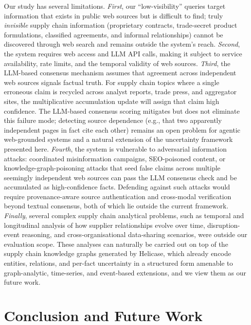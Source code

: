 \documentclass{article}
\begin{document}
Our study has several limitations. \textit{First}, our ``low-visibility'' queries target information that exists in public web sources but is difficult to find; truly \textit{invisible} supply chain information (proprietary contracts, trade-secret product formulations, classified agreements, and informal relationships) cannot be discovered through web search and remains outside the system's reach. \textit{Second}, the system requires web access and LLM API calls, making it subject to service availability, rate limits, and the temporal validity of web sources. \textit{Third}, the LLM-based consensus mechanism assumes that agreement across independent web sources signals factual truth. For supply chain topics where a single erroneous claim is recycled across analyst reports, trade press, and aggregator sites, the multiplicative accumulation update will assign that claim high confidence. The LLM-based consensus scoring mitigates but does not eliminate this failure mode; detecting source dependence (e.g., that two apparently independent pages in fact cite each other) remains an open problem for agentic web-grounded systems and a natural extension of the uncertainty framework presented here. \textit{Fourth}, the system is vulnerable to adversarial information attacks: coordinated misinformation campaigns, SEO-poisoned content, or knowledge-graph-poisoning attacks that seed false claims across multiple seemingly independent web sources can pass the LLM consensus check and be accumulated as high-confidence facts. Defending against such attacks would require provenance-aware source authentication and cross-modal verification beyond textual consensus, both of which lie outside the current framework. \textit{Finally}, several complex supply chain analytical problems, such as temporal and longitudinal analysis of how supplier relationships evolve over time, disruption-event reasoning, and cross-organisational data-sharing scenarios, were outside our evaluation scope. These analyses can naturally be carried out on top of the supply chain knowledge graphs generated by Helicase, which already encode entities, relations, and per-fact uncertainty in a structured form amenable to graph-analytic, time-series, and event-based extensions, and we view them as our future work.

\section{Conclusion and Future Work}
\label{sec:conclusion}
\end{document}
